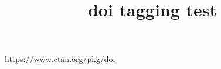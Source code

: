\documentclass{article}
\title{doi tagging test}
\begin{document}

\url{https://www.ctan.org/pkg/doi}
\end{document}
